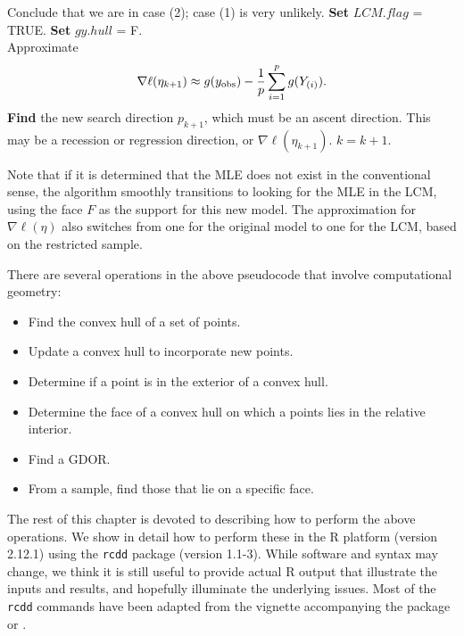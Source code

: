 {{\begin{algorithmic}
			\State Conclude that we are in case (2); case (1) is very unlikely.
			\State \textbf{Set} $LCM.flag$ = TRUE.
			\State \textbf{Set} $gy.hull$ = F.
		\EndIf
	\EndIf
\EndIf\\
	\State Approximate 
	\begin{align} \label{E:nabla ell approx LCM}
	\nabla \ell( \eta_{k+1}) \approx g(y_{\text{obs}}) - \frac{1}{p}\sum_{i=1}^p g(Y_{(i)}).
	\end{align}
\State \textbf{Find} the new search direction $p_{k+1}$, which must be an ascent 
direction.
\State This may be a recession or regression direction, or $\nabla \ell( \eta_{k+1})$.
\State $k = k + 1$.
\EndWhile
\end{algorithmic}
}
}

Note that if it is determined that the MLE does not exist in the conventional sense,
the algorithm smoothly transitions to looking for the MLE in the LCM, using the 
face $F$ as the support for this new model.  The approximation for $\nabla \ell (\eta)$
also switches from one for the original model to one for the LCM, based on the restricted
sample.  

There are several operations in the above pseudocode that involve computational geometry:
\begin{itemize}
\item Find the convex hull of a set of points.
\item Update a convex hull to incorporate new points.
\item Determine if a point is in the exterior of a convex hull.
\item Determine the face of a convex hull on which a points lies in the relative interior.
\item Find a GDOR.
\item From a sample, find those that lie on a specific face.
\end{itemize}

The rest of this chapter is devoted to describing how to perform the above
operations.  We show in detail how to perform these in the R platform (version 2.12.1)
using the \texttt{rcdd} package (version 1.1-3).  While software and syntax may change,
we think it is still useful to provide actual R output that illustrate the
inputs and results, and hopefully illuminate the underlying issues.  Most of the  
\texttt{rcdd} commands have been adapted from the vignette accompanying the package
or \citep{Geyer:2009}.

